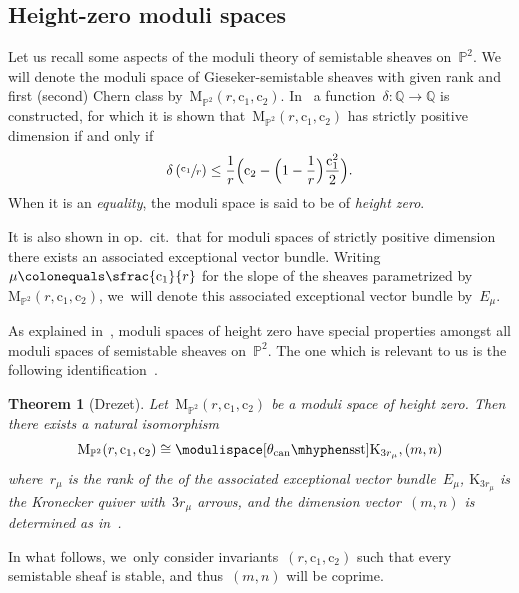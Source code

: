 \documentclass[JEP,XML,SOM,Unicode,NoEqCountersInSection,published]{cedram}
\theoremstyle{plain}
\newtheorem{theorem}{Theorem}[section]
\theoremstyle{definition}
\newcommand\can{\ensuremath{\mathrm{can}}}
\newcommand\moduli{\ensuremath{\mathrm{M}}}
\newcommand\semistable{\ensuremath{\mhyphen\mathrm{sst}}}
\begin{document}
\subsection{Height-zero moduli spaces}
\label{subsection:height-zero}
Let us recall some aspects of the moduli theory of semistable sheaves on~$\mathbb{P}^2$.
We will denote
the moduli space of Gieseker-semistable sheaves with given rank and first (\resp second) Chern class
by~$\moduli_{\mathbb{P}^2}(r,\mathrm{c}_1,\mathrm{c}_2)$.
In~\cite{MR0916199} a function~$\delta\colon\mathbb{Q}\to\mathbb{Q}$ is constructed,
for which it is shown that~$\moduli_{\mathbb{P}^2}(r,\mathrm{c}_1,\mathrm{c}_2)$ has strictly positive dimension
if and only if
\begin{equation*}
\delta\left( \sfrac{\mathrm{c}_1}{r} \right)
\leq
\frac{1}{r}\Bigl( \mathrm{c}_2 - \Bigl( 1-\frac{1}{r} \Bigr)\frac{\mathrm{c}_1^2}{2} \Bigr).
\end{equation*}
When it is an \emph{equality},
the moduli space is said to be of \emph{height zero}.

It is also shown in op.~cit.~that for moduli spaces of strictly positive dimension
there exists an associated exceptional vector bundle.
Writing~$\mu\colonequals\sfrac{\mathrm{c}_1}{r}$ for the slope of the sheaves parametrized by~$\moduli_{\mathbb{P}^2}(r,\mathrm{c}_1,\mathrm{c}_2)$, we~will denote this associated exceptional vector bundle by~$E_\mu$.

As explained in~\cite{MR0916199},
moduli spaces of height zero have special properties
amongst all moduli spaces of semistable sheaves on~$\mathbb{P}^2$.
The one which is relevant to us is the following identification~\cite[Th.\,2]{MR0916199}.

\begin{theorem}[Drezet]
\label{theorem:identification}
Let~$\moduli_{\mathbb{P}^2}(r,\mathrm{c}_1,\mathrm{c}_2)$ be a moduli space of height zero.
Then there exists a natural isomorphism
\begin{equation*}
\moduli_{\mathbb{P}^2}(r,\mathrm{c}_1,\mathrm{c}_2)
\cong
\modulispace[\theta_\can\semistable]{\mathrm{K}_{3r_\mu},(m,n)}
\end{equation*}
where~$r_\mu$ is the rank of the of the associated exceptional vector bundle~$E_\mu$,
$\mathrm{K}_{3r_\mu}$ is the Kronecker quiver with~$3r_\mu$ arrows,
and the dimension vector~$(m,n)$ is determined as in~\cite[\S IV.2]{MR0916199}.
\end{theorem}

In what follows, we~only consider invariants~$(r,\mathrm{c}_1,\mathrm{c}_2)$
such that every semistable sheaf is stable,
and thus~$(m,n)$ will be coprime.
\end{document}
